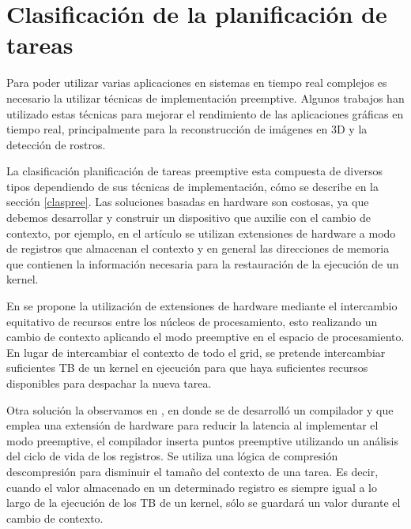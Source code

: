 \section{Clasificación de la planificación de tareas}
	
	Para poder utilizar varias aplicaciones en sistemas en tiempo real complejos es necesario la utilizar técnicas de implementación preemptive. Algunos trabajos han utilizado estas técnicas para mejorar el rendimiento de las aplicaciones gráficas en tiempo real, principalmente para la reconstrucción de imágenes en 3D y la detección de rostros.

\vspace{0.3cm}

La clasificación planificación de tareas preemptive esta compuesta de diversos tipos dependiendo de sus técnicas de implementación, cómo se describe en la sección \ref{claspree}. 
Las soluciones basadas en hardware son costosas, ya que debemos desarrollar y construir un dispositivo que auxilie con el cambio de contexto, por ejemplo, en el artículo \cite{18} se utilizan extensiones de hardware a modo de registros que almacenan el contexto y en general las direcciones de memoria que contienen la información necesaria para la restauración de la ejecución de un kernel. 

\vspace{0.3cm}

En \cite{20} se propone la utilización de extensiones de hardware mediante el intercambio equitativo de recursos entre los núcleos de procesamiento, esto realizando un cambio de contexto aplicando el modo preemptive en el espacio de procesamiento. En lugar de intercambiar el contexto de todo el grid, se pretende intercambiar suficientes TB de un kernel en ejecución para que haya suficientes recursos disponibles para despachar la nueva tarea. 

\vspace{0.3cm}

Otra solución la observamos en , en donde se de desarrolló un compilador y que emplea una extensión de hardware para reducir la latencia al implementar el modo preemptive, el compilador inserta puntos preemptive utilizando un análisis del ciclo de vida de los registros. Se utiliza una lógica de compresión descompresión para disminuir el tamaño del contexto de una tarea. Es decir, cuando el valor almacenado en un determinado registro es siempre igual a lo largo de la ejecución de los TB de un kernel, sólo se guardará un valor durante el cambio de contexto.

